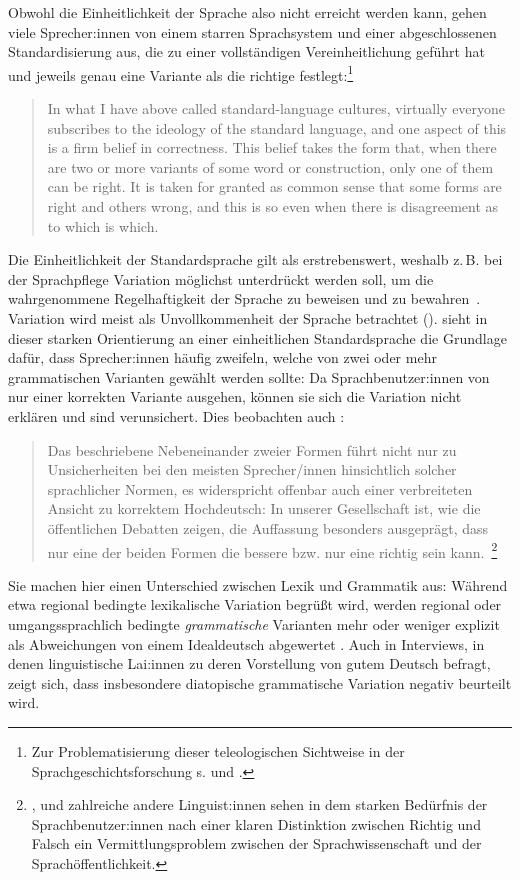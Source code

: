Obwohl die Einheitlichkeit der Sprache also nicht erreicht werden kann, gehen viele Sprecher:innen von einem starren Sprachsystem und einer abgeschlossenen Standardisierung aus, die zu einer vollständigen Vereinheitlichung geführt hat und jeweils genau eine Variante als die richtige festlegt:\footnote{Zur Problematisierung dieser teleologischen Sichtweise in der Sprachgeschichtsforschung s. \cite[]{Elspa2005} \citeyear[]{Elspa.2005} und \citeyear[]{Elspa2005}.}
\begin{quote}In what I have above called standard-language cultures, virtually everyone subscribes to the ideology of the standard language, and one aspect of this is a firm belief in correctness. This belief takes the form that, when there are two or more variants of some word or construction, only one of them can be right. It is taken for granted as common sense that some forms are right and others wrong, and this is so even when there is disagreement as to which is which.~\citep[535]{Milroy2001}\end{quote}
Die Einheitlichkeit der Standardsprache gilt als erstrebenswert, weshalb z.\,B. bei der Sprachpflege Variation m{\"o}glichst unterdr{\"u}ckt werden soll, um die wahrgenommene Regelhaftigkeit der Sprache zu beweisen und zu bewahren~\citep[s.][17]{Woolard1998}. 
Variation wird meist als Unvollkommenheit der Sprache betrachtet (\cites[s.][330]{Langer.}[163]{Gal.2016}). 
\citet[16]{Klein2003} sieht in dieser starken Orientierung an einer einheitlichen Standardsprache die Grundlage dafür, dass Sprecher:innen häufig zweifeln, welche von zwei oder mehr grammatischen Varianten gewählt werden sollte: Da Sprachbenutzer:innen von nur einer korrekten Variante ausgehen, können sie sich die Variation nicht erklären und sind verunsichert.
Dies beobachten auch \citet{Topalovic2008}: 
\begin{quote}
Das beschriebene Nebeneinander zweier Formen führt nicht nur zu Unsicherheiten bei den meisten Sprecher/innen hinsichtlich solcher sprachlicher Normen, es widerspricht offenbar auch einer verbreiteten Ansicht zu \glq korrektem Hochdeutsch\grq: In unserer Gesellschaft ist, wie die öffentlichen Debatten zeigen, die Auffassung besonders ausgeprägt, dass nur eine der beiden Formen die bessere bzw. nur eine \glq richtig\grq{} sein kann.~\citep[41]{Topalovic2008}\footnote{\citet{Topalovic2008}, \citet{Hennig2009} und zahlreiche andere Linguist:innen sehen in dem starken Bedürfnis der Sprachbenutzer:innen nach einer klaren Distinktion zwischen Richtig und Falsch ein Vermittlungsproblem zwischen der Sprachwissenschaft und der Sprachöffentlichkeit.}\end{quote}
Sie machen hier einen Unterschied zwischen Lexik und Grammatik aus: Während etwa regional bedingte lexikalische Variation begrüßt wird, werden \glqq regional oder umgangssprachlich bedingte \textit{grammatische} Varianten mehr oder weniger explizit als Abweichungen von einem \glq Idealdeutsch\grq{} abgewertet\grqq{} \citep[46, Hervorhebung im Original]{Topalovic2008}. 
Auch in Interviews, in denen \citet{Beuge2017} linguistische Lai:innen zu deren Vorstellung von gutem Deutsch befragt, zeigt sich, dass insbesondere diatopische grammatische Variation negativ beurteilt wird.

